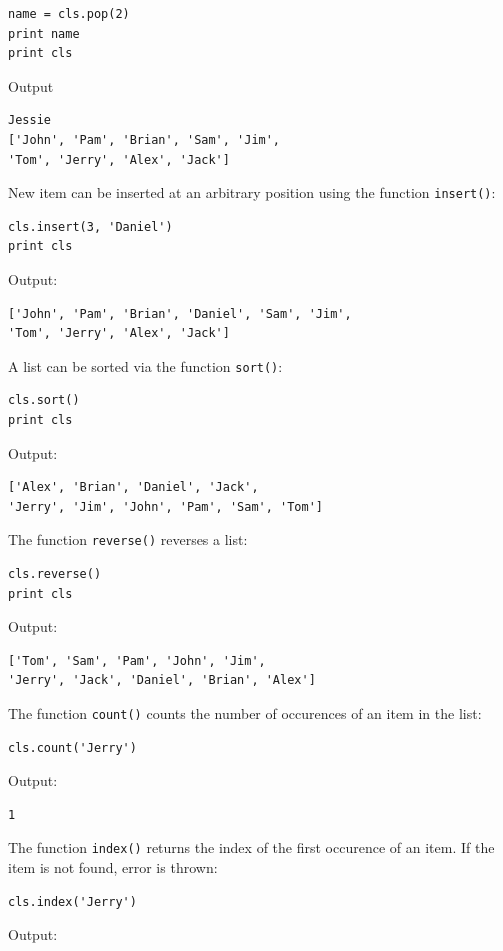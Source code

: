\begin{verbatim}
name = cls.pop(2)
print name 
print cls
\end{verbatim}
Output

\begin{verbatim}
Jessie
['John', 'Pam', 'Brian', 'Sam', 'Jim', 
'Tom', 'Jerry', 'Alex', 'Jack']
\end{verbatim}
New item can be inserted at an arbitrary position using the function {\tt insert()}:

\begin{verbatim}
cls.insert(3, 'Daniel')
print cls
\end{verbatim}
Output:

\begin{verbatim}
['John', 'Pam', 'Brian', 'Daniel', 'Sam', 'Jim', 
'Tom', 'Jerry', 'Alex', 'Jack']
\end{verbatim}
A list can be sorted via the function {\tt sort()}:

\begin{verbatim}
cls.sort()
print cls
\end{verbatim}
Output:

\begin{verbatim}
['Alex', 'Brian', 'Daniel', 'Jack', 
'Jerry', 'Jim', 'John', 'Pam', 'Sam', 'Tom']
\end{verbatim}
The function {\tt reverse()} reverses a list:

\begin{verbatim}
cls.reverse()
print cls
\end{verbatim}
Output:

\begin{verbatim}
['Tom', 'Sam', 'Pam', 'John', 'Jim', 
'Jerry', 'Jack', 'Daniel', 'Brian', 'Alex']
\end{verbatim}
The function {\tt count()} counts the number of occurences of an item
in the list:

\begin{verbatim}
cls.count('Jerry')
\end{verbatim}
Output:

\begin{verbatim}
1
\end{verbatim}
The function {\tt index()} returns the index of the first occurence 
of an item. If the item is not found, error is thrown:

\begin{verbatim}
cls.index('Jerry')
\end{verbatim}
Output:

